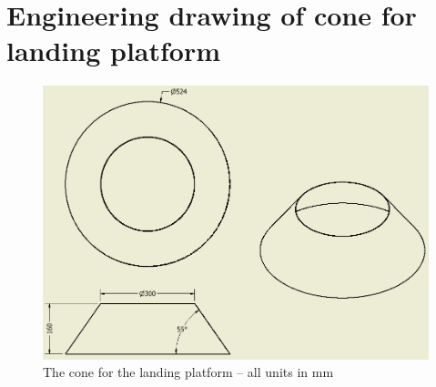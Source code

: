 \section{Engineering drawing of cone for landing platform}
\begin{figure}
	\centering
	\includegraphics[width=1\textwidth]{imgs/app1_cone_drawing}
	\caption{The cone for the landing platform -- all units in \si{\milli\meter}}
\end{figure}